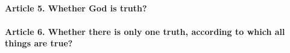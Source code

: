 \documentclass{ucetd}
\begin{document}
\paragraph{Article 5. Whether God is truth?}
\paragraph{Article 6. Whether there is only one truth, according to which all things are true?}
\end{document}
